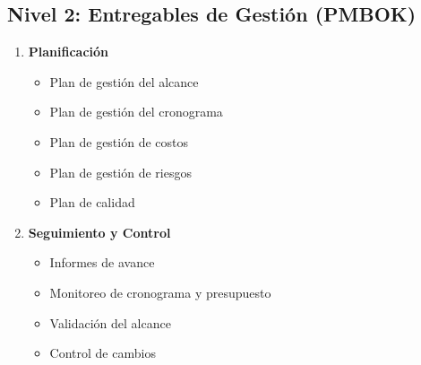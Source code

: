 \begin{multicols}{2}
\subsection*{Nivel 2: Entregables de Gestión (PMBOK)}
\begin{enumerate}
  \item \textbf{Planificación}
  \begin{itemize}
    \item Plan de gestión del alcance
    \item Plan de gestión del cronograma
    \item Plan de gestión de costos
    \item Plan de gestión de riesgos
    \item Plan de calidad
  \end{itemize}
  \item \textbf{Seguimiento y Control}
  \begin{itemize}
    \item Informes de avance
    \item Monitoreo de cronograma y presupuesto
    \item Validación del alcance
    \item Control de cambios
  \end{itemize}
\end{enumerate}
\end{multicols}